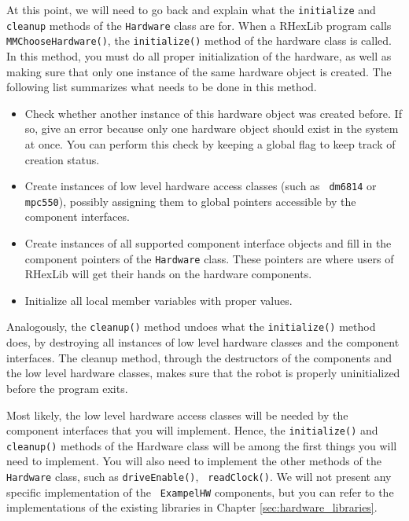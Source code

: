 At this point, we will need to go back and explain what the {\tt initialize}
and {\tt cleanup} methods of the {\tt Hardware} class are for. When a
RHexLib program calls {\tt MMChooseHardware()}, the {\tt initialize()}
method of the hardware class is called. In this method, you must do all
proper initialization of the hardware, as well as making sure that only one
instance of the same hardware object is created. The following list
summarizes what needs to be done in this method.

\begin{itemize}
\item{Check whether another instance of this hardware object was created
before. If so, give an error because only one hardware object should exist
in the system at once. You can perform this check by keeping a global flag
to keep track of creation status.}

\item{Create instances of low level hardware access classes (such as {\tt
dm6814} or {\tt mpc550}), possibly assigning them to global pointers
accessible by the component interfaces.}

\item{Create instances of all supported component interface objects and fill
in the component pointers of the {\tt Hardware} class. These pointers are
where users of RHexLib will get their hands on the hardware components.}

\item{Initialize all local member variables with proper values.}

\end{itemize}

Analogously, the {\tt cleanup()} method undoes what the {\tt initialize()}
method does, by destroying all instances of low level hardware classes and
the component interfaces. The cleanup method, through the destructors of the
components and the low level hardware classes, makes sure that the robot is
properly uninitialized before the program exits.

Most likely, the low level hardware access classes will be needed by the
component interfaces that you will implement. Hence, the {\tt initialize()}
and {\tt cleanup()} methods of the Hardware class will be among the first
things you will need to implement. You will also need to implement the other
methods of the {\tt Hardware} class, such as {\tt driveEnable()}, {\tt
readClock()}. We will not present any specific implementation of the {\tt
ExampelHW} components, but you can refer to the implementations of the
existing libraries in Chapter \ref{sec:hardware_libraries}.




